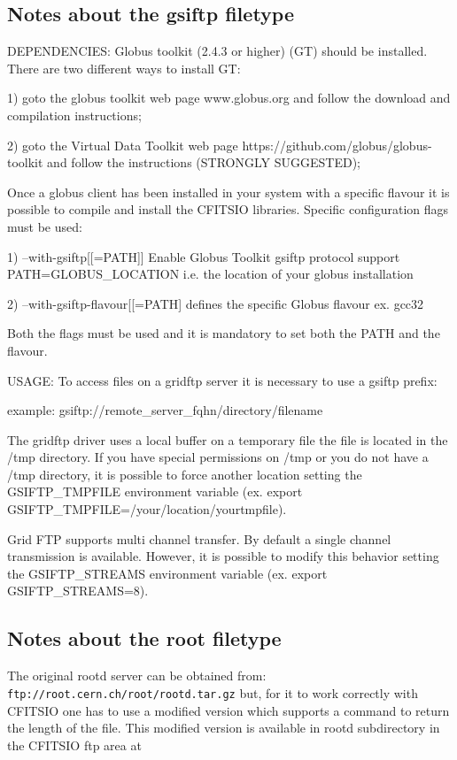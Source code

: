 \documentclass[11pt]{book}
\begin{document}
\subsection{Notes about the gsiftp filetype}

DEPENDENCIES: Globus toolkit (2.4.3 or higher) (GT) should be installed.
There are two different ways to install GT:

1) goto the globus toolkit web page www.globus.org and follow the
   download and compilation instructions;

2) goto the Virtual Data Toolkit web page https://github.com/globus/globus-toolkit
   and follow the instructions (STRONGLY SUGGESTED);

Once a globus client has been installed in your system with a specific flavour
it is possible to compile and install the CFITSIO libraries.
Specific configuration flags must be used:

1)  --with-gsiftp[[=PATH]] Enable Globus Toolkit gsiftp protocol support
    PATH=GLOBUS\_LOCATION i.e. the location of your globus installation

2)  --with-gsiftp-flavour[[=PATH] defines the specific Globus flavour
        ex. gcc32

Both the flags must be used and it is mandatory to set  both the PATH and the
flavour.

USAGE: To access files on a gridftp server it is necessary to use a gsiftp prefix:

example: gsiftp://remote\_server\_fqhn/directory/filename

The gridftp driver uses a local buffer on a temporary file the file is located
in the /tmp directory. If you have special permissions on /tmp or you do not have a /tmp
directory, it is possible to force another location setting the GSIFTP\_TMPFILE environment
variable (ex. export GSIFTP\_TMPFILE=/your/location/yourtmpfile).

Grid FTP supports multi channel transfer. By default a single channel transmission is
available. However, it is possible to modify this behavior setting the GSIFTP\_STREAMS
environment variable (ex. export GSIFTP\_STREAMS=8).


\subsection{Notes about the root filetype}

The original rootd server can be obtained from:
\verb-ftp://root.cern.ch/root/rootd.tar.gz-
but, for it to work correctly with CFITSIO one has to use a modified
version which supports a command to return the length of the file.
This modified version is available in rootd subdirectory
in the CFITSIO ftp area at
\end{document}
